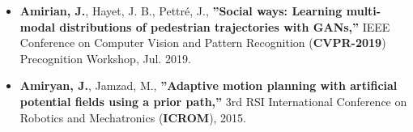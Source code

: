 \documentclass[10pt]{res}
\begin{document}
\begin{resume}
\begin{itemize}
\item {\bf Amirian, J.}, Hayet, J. B., Pettré, J., {\bf ''Social ways: Learning multi-modal distributions of pedestrian trajectories with GANs,''} IEEE Conference on Computer Vision and Pattern Recognition (\textbf{CVPR-2019}) Precognition Workshop, Jul. 2019.


\item {\bf Amiryan, J.}, Jamzad, M., {\bf ''Adaptive motion planning with artificial potential fields using a prior path,''} 3rd RSI International Conference on Robotics and Mechatronics (\textbf{ICROM}), 2015.



\end{itemize}



	

\end{resume}
\end{document}

